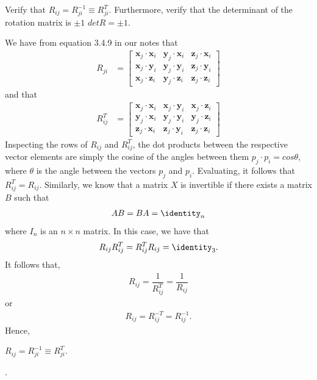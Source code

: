 
\noindent 
\begin{homework}
	Verify that $R_{ij} = R_{ji}^{-1} \equiv R_{ji}^T$. Furthermore, verify that the determinant of the rotation matrix is $\pm1$ \ie $det R = \pm1$.
\end{homework}

\begin{solution}
	We have from equation 3.4.9 in our notes that
%
\begin{align}
R_{ji} &= 	\begin{bmatrix}
	\bm{x}_j \cdot \bm{x}_i & \bm{y}_j \cdot \bm{x}_i & \bm{z}_j \cdot \bm{x}_i \\
	\bm{x}_j \cdot \bm{y}_i & \bm{y}_j \cdot \bm{y}_i & \bm{z}_j \cdot \bm{y}_i \\
	\bm{x}_j \cdot \bm{z}_i & \bm{y}_j \cdot \bm{z}_i & \bm{z}_j \cdot \bm{z}_i 
	\end{bmatrix} 
	\label{eq:rot}
	\end{align}
	and that
\begin{align}
	R_{ij}^T & = 
	\begin{bmatrix}
	\bm{x}_j \cdot \bm{x}_i & \bm{x}_j \cdot \bm{y}_i  & \bm{x}_j \cdot \bm{z}_i \\
	\bm{y}_j \cdot \bm{x}_i & \bm{y}_j \cdot \bm{y}_i & \bm{y}_j \cdot \bm{z}_i \\
	\bm{z}_j \cdot \bm{x}_i & \bm{z}_j \cdot \bm{y}_i  & \bm{z}_j \cdot \bm{z}_i 
	\end{bmatrix}
	\end{align}
	Inspecting the rows of $R_{ij}$ and $R_{ij}^T$, the dot products between the respective vector elements are simply the cosine of the angles between them \ie $p_j \cdot p_i = cos \theta$, where $\theta$ is the angle between the vectors $p_j$ and $p_i$. Evaluating, it follows that $R_{ij}^T = R_{ij}$. Similarly, we know that a matrix $X$ is invertible if there exists a matrix $B$ such that
	\begin{align}
		AB = BA = \identity_n
	\end{align}
	where $I_n$ is an $n \times n$ matrix. In this case, we have that 
	\begin{align}
	R_{ij} R_{ij}^T = R_{ij}^T R_{ij} = \identity_3.
	\end{align}
	It follows that, 
	\begin{align}
	R_{ij} = \dfrac{1}{R_{ij}^T} = \dfrac{1}{R_{ij}} 
	\end{align}
	or 
	\begin{align}
	R_{ij} = R_{ij}^{-T} = R_{ij}^{-1}. 
	\end{align}
	Hence, 
	\begin{tcolorbox}[title=QED]
		$R_{ij} = R_{ji}^{-1} \equiv R_{ji}^T$.
	\end{tcolorbox}.
\end{solution}


